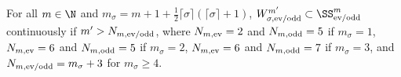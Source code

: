 \begin{Theorem}\label{t:Sobolev}
  For all $m\in\N$ and $m_\sigma=m+1+\frac{1}{2}\lceil\sigma\rceil(\lceil\sigma\rceil+1)$, $W_{\sigma,\text{\rm ev/odd}}^{m'}\subset\SS_{\text{\rm ev/odd}}^m$ continuously if $m'>N_{m,\text{\rm ev/odd}}$, where $N_{m,\text{\rm ev}}=2$ and $N_{m,\text{\rm odd}}=5$ if $m_\sigma=1$, $N_{m,\text{\rm ev}}=6$ and $N_{m,\text{\rm odd}}=5$ if $m_\sigma=2$, $N_{m,\text{\rm ev}}=6$ and $N_{m,\text{\rm odd}}=7$ if $m_\sigma=3$, and $N_{m,\text{\rm ev/odd}}=m_\sigma+3$ for $m_\sigma\ge4$.
\end{Theorem}
